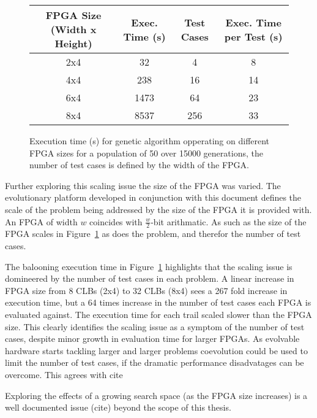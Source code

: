 \begin{figure}
	\centering
\begin{tabular}{cccc}
	\toprule
	\bfseries{FPGA Size (Width x Height)} & \bfseries{Exec. Time (s)} & \bfseries{Test Cases}
	& \bfseries{Exec. Time per Test (s)} \\
	\midrule
	2x4 & 32 & 4 & 8\\
	4x4 & 238 & 16 & 14\\
	6x4 & 1473 & 64 & 23\\
	8x4 & 8537 & 256 & 33\\
	\bottomrule
\end{tabular}
\caption[Execution time for genetic algorithm opperating on different FPGA sizes]
{Execution time (s) for genetic algorithm opperating on different FPGA sizes for
a population of 50 over 15000 generations, the number of test cases is defined
by the width of the FPGA.}
\label{fig:size}
\end{figure}

Further exploring this scaling issue the size of the FPGA was varied.
The evolutionary platform developed in conjunction with this document
defines the scale of the problem being addressed by the size of the FPGA
it is provided with. An FPGA of width $w$ coincides with $\frac{w}{2}$-bit arithmatic.
As such as the size of the FPGA scales in Figure~\ref{fig:size} as does
the problem, and therefor the number of test cases.

The balooning execution time in Figure~\ref{fig:size} highlights that the
scaling issue is domineered by the number of test cases in each problem. A linear increase in FPGA
size from 8 CLBs (2x4) to 32 CLBs (8x4) sees a 267 fold increase in execution
time, but a 64 times increase in the number of test cases each FPGA is evaluated
against. The execution time for each trail scaled slower than the FPGA size.
This clearly identifies the scaling issue as a symptom of the number
of test cases, despite minor growth in evaluation time for larger FPGAs.
As evolvable hardware starts tackling larger and larger
problems coevolution could be used to limit the number of test cases, if the
dramatic performance disadvatages can be overcome. This agrees with \todo cite

Exploring the effects of a growing search space (as the FPGA size increases)
is a well documented issue (\todo cite) beyond the scope of this thesis.
